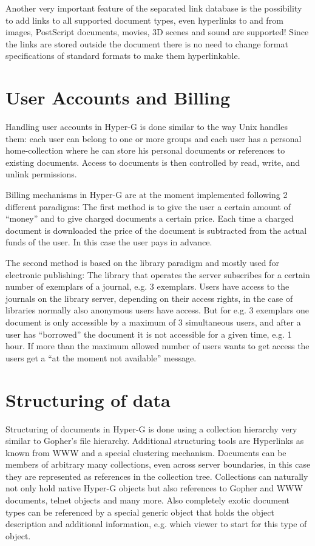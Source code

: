 Another very important feature of the separated link database is the
possibility to add links to all supported document types, even
hyperlinks to and from images, PostScript documents, movies, 3D scenes
and sound are supported! Since the links are stored outside the
document there is no need to change format specifications of standard
formats to make them hyperlinkable.

\section{User Accounts and Billing}

Handling user accounts in Hyper-G is done similar to the way Unix
handles them: each user can belong to one or more groups and each user
has a personal home-collection where he can store his personal
documents or references to existing documents. Access to documents is
then controlled by read, write, and unlink permissions.

Billing mechanisms in Hyper-G are at the moment implemented following
2 different paradigms: The first method is to give the user a certain
amount of ``money'' and to give charged documents a certain
price. Each time a charged document is downloaded the price of the
document is subtracted from the actual funds of the user. In this case
the user pays in advance. 

The second method is based on the library paradigm and mostly used for
electronic publishing: The library that operates the server subscribes
for a certain number of exemplars of a journal, e.g. 3
exemplars. Users have access to the journals on the library server,
depending on their access rights, in the case of libraries normally
also anonymous users have access. But for e.g. 3 exemplars one
document is only accessible by a maximum of 3 simultaneous users, and
after a user has ``borrowed'' the document it is not accessible for a
given time, e.g. 1 hour. If more than the maximum allowed number of
users wants to get access the users get a ``at the moment not
available'' message.

\section{Structuring of data}

Structuring of documents in Hyper-G is done using a collection
hierarchy very similar to Gopher's file hierarchy. Additional
structuring tools are Hyperlinks as known from WWW and a special
clustering mechanism. Documents can be members of arbitrary many
collections, even across server boundaries, in this case they are
represented as references in the collection tree. Collections can
naturally not only hold native Hyper-G objects but also references to
Gopher and WWW documents, telnet objects and many more. Also
completely exotic document types can be referenced by a special
generic object that holds the object description and additional
information, e.g. which viewer to start for this type of object.

